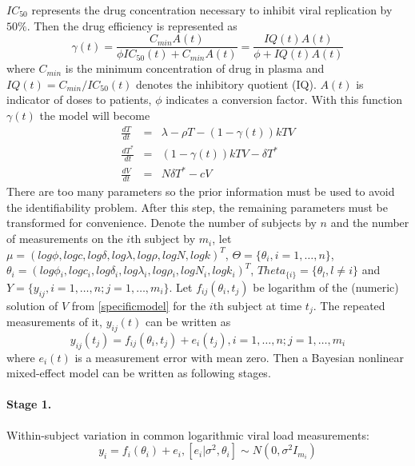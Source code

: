 \documentclass[12pt]{extarticle}
\begin{document}
$IC_{50}$ represents the drug concentration necessary to inhibit viral replication by $50\%$. Then the drug efficiency is represented as
\begin{equation}
\gamma{}(t)=\frac{C_{min}A(t)}{\phi{}IC_{50}(t)+C_{min}A(t)}=\frac{IQ(t)A(t)}{\phi{}+IQ(t)A(t)}
\end{equation}
where $C_{min}$ is the minimum concentration of drug in plasma and $IQ(t)=C_{min}/IC_{50}(t)$ denotes  the inhibitory quotient (IQ). $A(t)$ is indicator of doses to patients, $\phi$ indicates a conversion factor. With this function $\gamma{}(t)$ the model will become
\begin{equation}
\begin{array}{rcl}
\frac{dT}{dt} & = & \lambda{}-\rho{}T-(1-\gamma{}(t))kTV \\
\frac{dT^{*}}{dt} & = & (1-\gamma{}(t))kTV-\delta{}T^{*} \\
\frac{dV}{dt} & = & N\delta{}T^{*}-cV  \label{specificmodel}
\end{array}
\end{equation}
There are too many parameters so the prior information must be used to avoid the identifiability problem. After this step, the remaining parameters must be transformed for convenience. Denote the number of subjects by $n$ and the number of measurements on the $i$th subject by $m_i$, let $\mu=(log\phi{},logc,log\delta{},log\lambda{},log\rho{},logN,logk)^{T}$, $\Theta=\{\theta_{i},i=1,\ldots,n\}$, $\theta_{i}=(log\phi{}_{i},logc_{i},log\delta{}_{i},log\lambda{}_{i},log\rho{}_{i},logN_{i},logk_{i})^{T}$, $Theta_{\{i\}}=\{\theta_{l},l\neq{}i\}$ and $Y=\{y_{ij},i=1,\ldots,n;j=1,\ldots,m_{i}\}$. Let $f_{ij}(\theta_{i},t_{j})$ be logarithm of the (numeric) solution of $V$ from \eqref{specificmodel} for the $i$th subject at time $t_j$. The repeated measurements of it, $y_{ij}(t)$ can be written as
\begin{equation}
y_{ij}(t_{j})=f_{ij}(\theta_{i},t_{j})+e_{i}(t_{j}), i=1,\ldots,n;j=1,\ldots,m_{i}
\end{equation}
where $e_{i}(t)$ is a measurement error with mean zero. Then a Bayesian nonlinear mixed-effect model can be written as following stages.

\paragraph{Stage 1.}
Within-subject variation in common logarithmic viral load measurements:
\begin{equation}
y_{i}=f_{i}(\theta{}_{i})+e_{i}, [e_{i}|\sigma{}^{2},\theta{}_{i}]\sim{}N(0,\sigma{}^{2}I_{m_i})
\end{equation}
\end{document}
